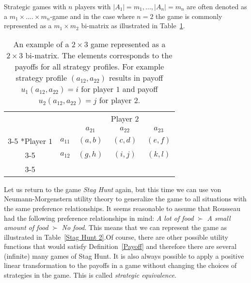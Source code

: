 \documentclass{article}
\theoremstyle{definition}
\theoremstyle{remark}
\begin{document}
Strategic games with $n$ players with $|A_1| = m_1,...,|A_n| = m_n$
are often denoted as a $m_1 \times .... \times m_n$-game and in the
case where $n = 2$ the game is commonly represented as a $m_1 \times
m_2$ bi-matrix as illustrated in Table~\ref{bi-matrix}.\\

\begin{table}[h!]
  \begin{center}
    \setlength{\extrarowheight}{2pt}
    \begin{tabular}{cc|c|c|c|}
      & \multicolumn{2}{c}{} & \multicolumn{1}{c}{Player $2$} & \multicolumn{1}{c}{}\\
      & \multicolumn{1}{c}{} & \multicolumn{1}{c}{$a_{21}$}  &
                                                          \multicolumn{1}{c}{$a_{22}$} & \multicolumn{1}{c}{$a_{23}$} \\\cline{3-5}
      \multirow{2}*{Player $1$}  & $a_{11}$ & $(a,b)$ & $(c,d)$ & $(e,f)$\\\cline{3-5}
      & $a_{12}$ & $(g,h)$ & $(i,j)$ & $(k,l)$\\\cline{3-5}
    \end{tabular}
    \caption{An example of a $2 \times 3$ game represented as a $2
      \times 3$ bi-matrix. The elements corresponds to the payoffs for
      all strategy profiles. For example strategy profile
      $(a_{12},a_{22})$ results in payoff $u_1(a_{12},a_{22}) = i$ for
      player $1$ and payoff $u_2(a_{12},a_{22}) = j$ for player $2$.}
    \label{bi-matrix}
    \end{center}
  \end{table}

Let us return to the game \emph{Stag Hunt} again, but this time we can
use von Neumann-Morgenstern utility theory to generalize the game to
all situations with the same preference relationships. It seems
reasonable to assume that Rousseau had the following preference
relationships in mind: \emph{A lot of food} $\succ$ \emph{A small
  amount of food} $\succ$ \emph{No food}. This means that we can
represent the game as illustrated in Table~\ref{Stag Hunt 2}.Of course, there are other possible utility functions that would
satisfy Definition~\ref{Payoff} and therefore there are several
(infinite) many games of Stag Hunt. It is also always possible to
apply a positive linear transformation to the payoffs in a game
without changing the choices of strategies in the game. This is called
\emph{strategic equivalence}. \\
\end{document}
